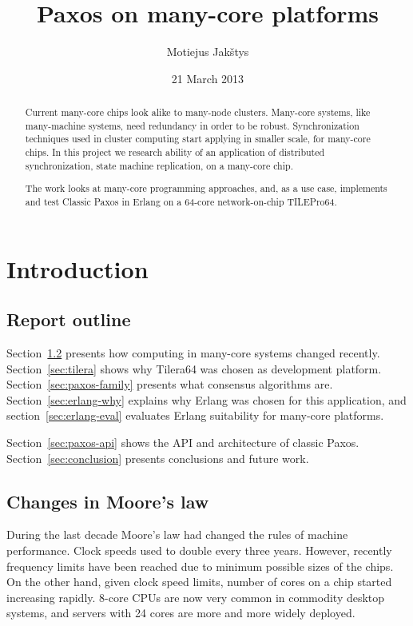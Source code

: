 \documentclass[english,11pt]{l4proj}
\begin{document}
\title{Paxos on many-core platforms}
\author{Motiejus Jakštys}
\date{21 March 2013}

\maketitle

\begin{abstract}

Current many-core chips look alike to many-node clusters. Many-core systems,
like many-machine systems, need redundancy in order to be robust.
Synchronization techniques used in cluster computing start applying in smaller
scale, for many-core chips. In this project we research ability of an
application of distributed synchronization, state machine replication, on a
many-core chip.

The work looks at many-core programming approaches, and, as a use case,
implements and test Classic Paxos in Erlang on a 64-core network-on-chip
TILEPro64.

\end{abstract}

\tableofcontents
\pagebreak

\section{Introduction}

\subsection{Report outline}

Section~\ref{sec:many-core} presents how computing in many-core systems changed
recently. Section~\ref{sec:tilera} shows why Tilera64 was chosen as development
platform. Section~\ref{sec:paxos-family} presents what consensus algorithms are.
Section~\ref{sec:erlang-why} explains why Erlang was chosen for this
application, and section~\ref{sec:erlang-eval} evaluates Erlang suitability for
many-core platforms.

Section~\ref{sec:paxos-api} shows the API and architecture of classic Paxos.
Section~\ref{sec:conclusion} presents conclusions and future work.

\subsection{Changes in Moore's law}
\label{sec:many-core}

During the last decade Moore's law had changed the rules of machine performance.
Clock speeds used to double every three years. However, recently frequency
limits have been reached due to minimum possible sizes of the chips. On the
other hand, given clock speed limits, number of cores on a chip started
increasing rapidly. 8-core CPUs are now very common in commodity desktop
systems, and servers with 24 cores are more and more widely deployed.
\end{document}
